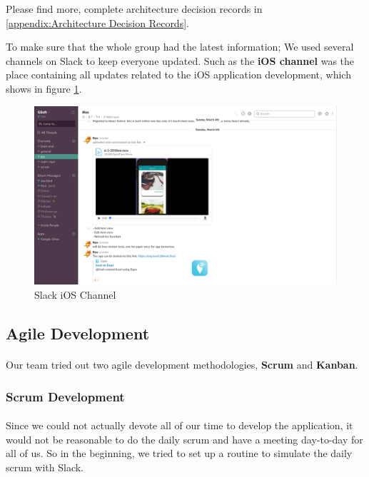 \documentclass[12pt,a4paper]{article}
\begin{document}
        Please find more, complete architecture decision records in \ref{appendix:Architecture Decision Records}.
        
        To make sure that the whole group had the latest information; We used several channels on Slack to keep everyone updated. Such as the {\bf iOS channel} was the place containing all updates related to the iOS application development, which shows in figure \ref{fig:Slack iOS Channel}. 
        
        \begin{figure}[H]
          \centering
          \includegraphics[width=1\textwidth]{../assets/development-records-slack-ios-channel.png}
          \caption{Slack iOS Channel}
          \label{fig:Slack iOS Channel}
        \end{figure}

      \subsection{Agile Development} 
        
        \paragraph{}Our team tried out two agile development methodologies, {\bf Scrum} and {\bf Kanban}.

        \subsubsection{Scrum Development}
          \paragraph{}Since we could not actually devote all of our time to develop the application, it would not be reasonable to do the daily scrum and have a meeting day-to-day for all of us. So in the beginning, we tried to set up a routine to simulate the daily scrum with Slack.
\end{document}
